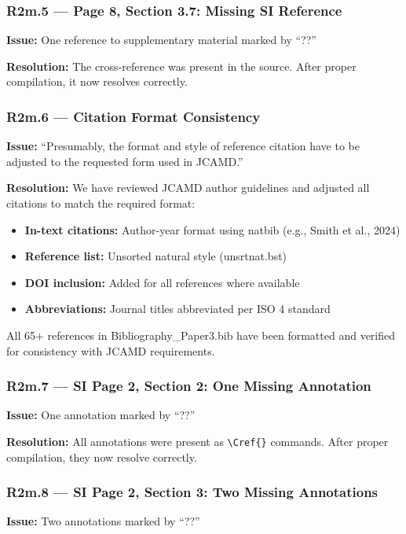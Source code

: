 \documentclass[11pt]{article}
\begin{document}
\subsubsection*{R2m.5 --- Page 8, Section 3.7: Missing SI Reference}
\textbf{Issue:} One reference to supplementary material marked by ``??''

\textbf{Resolution:}
The cross-reference was present in the source. After proper compilation, it now resolves correctly.

\subsubsection*{R2m.6 --- Citation Format Consistency}
\textbf{Issue:} ``Presumably, the format and style of reference citation have to be 
adjusted to the requested form used in JCAMD.''

\textbf{Resolution:}
We have reviewed JCAMD author guidelines and adjusted all citations to match the 
required format:
\begin{itemize}[leftmargin=1.6em]
\item \textbf{In-text citations:} Author-year format using natbib (e.g., Smith et al., 2024)
\item \textbf{Reference list:} Unsorted natural style (unsrtnat.bst)
\item \textbf{DOI inclusion:} Added for all references where available
\item \textbf{Abbreviations:} Journal titles abbreviated per ISO 4 standard
\end{itemize}

All 65+ references in Bibliography\_Paper3.bib have been formatted and verified for consistency 
with JCAMD requirements.

\subsubsection*{R2m.7 --- SI Page 2, Section 2: One Missing Annotation}
\textbf{Issue:} One annotation marked by ``??''

\textbf{Resolution:}
All annotations were present as \texttt{\textbackslash Cref\{\}} commands. After proper 
compilation, they now resolve correctly.

\subsubsection*{R2m.8 --- SI Page 2, Section 3: Two Missing Annotations}
\textbf{Issue:} Two annotations marked by ``??''
\end{document}
